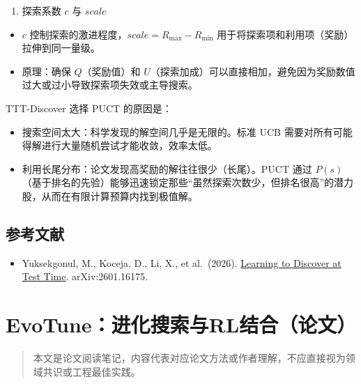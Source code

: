 \begin{enumerate}
\def\labelenumi{\arabic{enumi}.}
\setcounter{enumi}{3}
\tightlist
\item
  探索系数 \(c\) 与 \(scale\)
\end{enumerate}

\begin{itemize}
\tightlist
\item
  \(c\) 控制探索的激进程度，\(scale = R_{\max} - R_{\min}\) 用于将探索项和利用项（奖励）拉伸到同一量级。
\item
  原理：确保 \(Q\)（奖励值）和 \(U\)（探索加成）可以直接相加，避免因为奖励数值过大或过小导致探索项失效或主导搜索。
\end{itemize}

TTT-Discover 选择 PUCT 的原因是：

\begin{itemize}
\tightlist
\item
  搜索空间太大：科学发现的解空间几乎是无限的。标准 UCB 需要对所有可能得解进行大量随机尝试才能收敛，效率太低。
\item
  利用长尾分布：论文发现高奖励的解往往很少（长尾）。PUCT 通过 \(P(s)\)（基于排名的先验）能够迅速锁定那些``虽然探索次数少，但排名很高''的潜力股，从而在有限计算预算内找到极值解。
\end{itemize}

\hypertarget{ux53c2ux8003ux6587ux732e-145}{%
\subsection{参考文献}\label{ux53c2ux8003ux6587ux732e-145}}

\begin{itemize}
\tightlist
\item
  Yuksekgonul, M., Koceja, D., Li, X., et al.~(2026). \href{https://arxiv.org/abs/2601.16175}{Learning to Discover at Test Time}. arXiv:2601.16175.
\end{itemize}

\clearpage

\hypertarget{evotuneux8fdbux5316ux641cux7d22ux4e0erlux7ed3ux5408ux8bbaux6587}{%
\section{EvoTune：进化搜索与RL结合（论文）}\label{evotuneux8fdbux5316ux641cux7d22ux4e0erlux7ed3ux5408ux8bbaux6587}}

\begin{quote}
本文是论文阅读笔记，内容代表对应论文方法或作者理解，不应直接视为领域共识或工程最佳实践。
\end{quote}

